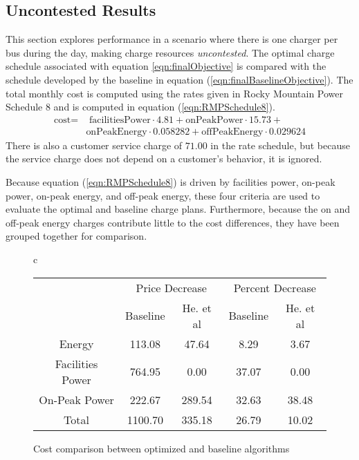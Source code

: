 \subsection{Uncontested Results}
This section explores performance in a scenario where there is one charger per bus during the day, making charge resources \textit{uncontested}. The optimal charge schedule associated with equation \ref{eqn:finalObjective} is compared with the schedule developed by the baseline in equation (\ref{eqn:finalBaselineObjective}). The total monthly cost is computed using the rates given in Rocky Mountain Power Schedule 8 and is computed in equation (\ref{eqn:RMPSchedule8}).
	\begin{equation}\label{eqn:RMPSchedule8}
		\begin{aligned}
			\text{cost} = & \text{ facilitiesPower}\cdot 4.81 + \text{onPeakPower}\cdot 15.73 + \\ 
			& \text{onPeakEnergy}\cdot 0.058282 + \text{offPeakEnergy}\cdot 0.029624
		\end{aligned}
	\end{equation}
	There is also a customer service charge of $71.00$ in the rate schedule, but because the service charge does not depend on a customer's behavior, it is ignored.
\par Because equation (\ref{eqn:RMPSchedule8}) is driven by facilities power, on-peak power, on-peak energy, and off-peak energy, these four criteria are used to evaluate the optimal and baseline charge plans.  Furthermore, because the on and off-peak energy charges contribute little to the cost differences, they have been grouped together for comparison.
\begin{figure}
	\centering
	\begin{tabular}{c}
	 \\[0.2in]
	\begin{tabular}{c | c | c | c | c}
                 & \multicolumn{2}{c|}{Price Decrease} & \multicolumn{2}{c}{Percent Decrease}\\\cline{2-5}
	               & Baseline & He. et al & Baseline & He. et al \\\hline
Energy           &  113.08  & 47.64     & 8.29     & 3.67      \\
Facilities Power &  764.95  & 0.00      & 37.07    & 0.00      \\
On-Peak Power    &  222.67  & 289.54    & 32.63    & 38.48     \\
Total            & 1100.70  & 335.18    & 26.79    & 10.02     \\ 
	\end{tabular} 
	\end{tabular}
	\caption{Cost comparison between optimized and baseline algorithms}
	\label{fig:costComparison}  
\end{figure}
